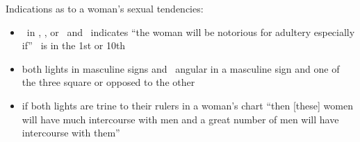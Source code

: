 Indications as to a woman's sexual tendencies:
\begin{itemize}[topsep=0em,itemsep=0em]
\item \Moon\, in \Taurus, \Aquarius, or \Pisces\, and \Mars\Conjunction\Mercury\, indicates ``the woman will be notorious for adultery especially if'' \Venus\, is in the 1st or 10th

\item both lights in masculine signs and \Venus\, angular in a masculine sign and one of the three square or opposed to the other

\item if both lights are trine to their rulers in a woman's chart ``then [these] women will have much intercourse with men and a great number of men will have intercourse with them''
\end{itemize}
